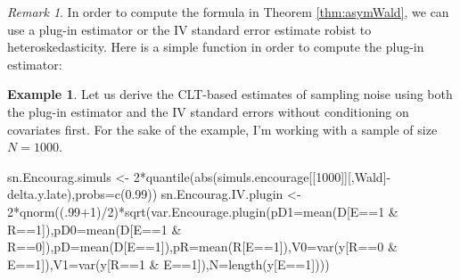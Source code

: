\documentclass[
]{book}
\newenvironment{Shaded}{\begin{snugshade}}{\end{snugshade}}
\newcommand{\AttributeTok}[1]{\textcolor[rgb]{0.77,0.63,0.00}{#1}}
\newcommand{\DecValTok}[1]{\textcolor[rgb]{0.00,0.00,0.81}{#1}}
\newcommand{\FloatTok}[1]{\textcolor[rgb]{0.00,0.00,0.81}{#1}}
\newcommand{\FunctionTok}[1]{\textcolor[rgb]{0.00,0.00,0.00}{#1}}
\newcommand{\NormalTok}[1]{#1}
\newcommand{\OtherTok}[1]{\textcolor[rgb]{0.56,0.35,0.01}{#1}}
\newcommand{\SpecialCharTok}[1]{\textcolor[rgb]{0.00,0.00,0.00}{#1}}
\newcommand{\StringTok}[1]{\textcolor[rgb]{0.31,0.60,0.02}{#1}}
\theoremstyle{definition}
\theoremstyle{definition}
\newtheorem{example}{Example}[chapter]
\theoremstyle{definition}
\theoremstyle{definition}
\theoremstyle{remark}
\newtheorem*{remark}{Remark}
\begin{document}
\begin{remark}
\iffalse{} {Remark. } \fi{}In order to compute the formula in Theorem \ref{thm:asymWald}, we can use a plug-in estimator or the IV standard error estimate robist to heteroskedasticity.
Here is a simple function in order to compute the plug-in estimator:
\end{remark}

\begin{example}
\protect\hypertarget{exm:unnamed-chunk-134}{}{\label{exm:unnamed-chunk-134} }Let us derive the CLT-based estimates of sampling noise using both the plug-in estimator and the IV standard errors without conditioning on covariates first.
For the sake of the example, I'm working with a sample of size \(N=1000\).
\end{example}

\begin{Shaded}
\begin{Highlighting}[]
\NormalTok{sn.Encourag.simuls }\OtherTok{\textless{}{-}} \DecValTok{2}\SpecialCharTok{*}\FunctionTok{quantile}\NormalTok{(}\FunctionTok{abs}\NormalTok{(simuls.encourage[[}\StringTok{\textquotesingle{}1000\textquotesingle{}}\NormalTok{]][,}\StringTok{\textquotesingle{}Wald\textquotesingle{}}\NormalTok{]}\SpecialCharTok{{-}}\NormalTok{delta.y.late),}\AttributeTok{probs=}\FunctionTok{c}\NormalTok{(}\FloatTok{0.99}\NormalTok{))}
\NormalTok{sn.Encourag.IV.plugin }\OtherTok{\textless{}{-}} \DecValTok{2}\SpecialCharTok{*}\FunctionTok{qnorm}\NormalTok{((.}\DecValTok{99}\SpecialCharTok{+}\DecValTok{1}\NormalTok{)}\SpecialCharTok{/}\DecValTok{2}\NormalTok{)}\SpecialCharTok{*}\FunctionTok{sqrt}\NormalTok{(}\FunctionTok{var.Encourage.plugin}\NormalTok{(}\AttributeTok{pD1=}\FunctionTok{mean}\NormalTok{(D[E}\SpecialCharTok{==}\DecValTok{1} \SpecialCharTok{\&}\NormalTok{ R}\SpecialCharTok{==}\DecValTok{1}\NormalTok{]),}\AttributeTok{pD0=}\FunctionTok{mean}\NormalTok{(D[E}\SpecialCharTok{==}\DecValTok{1} \SpecialCharTok{\&}\NormalTok{ R}\SpecialCharTok{==}\DecValTok{0}\NormalTok{]),}\AttributeTok{pD=}\FunctionTok{mean}\NormalTok{(D[E}\SpecialCharTok{==}\DecValTok{1}\NormalTok{]),}\AttributeTok{pR=}\FunctionTok{mean}\NormalTok{(R[E}\SpecialCharTok{==}\DecValTok{1}\NormalTok{]),}\AttributeTok{V0=}\FunctionTok{var}\NormalTok{(y[R}\SpecialCharTok{==}\DecValTok{0} \SpecialCharTok{\&}\NormalTok{ E}\SpecialCharTok{==}\DecValTok{1}\NormalTok{]),}\AttributeTok{V1=}\FunctionTok{var}\NormalTok{(y[R}\SpecialCharTok{==}\DecValTok{1} \SpecialCharTok{\&}\NormalTok{ E}\SpecialCharTok{==}\DecValTok{1}\NormalTok{]),}\AttributeTok{N=}\FunctionTok{length}\NormalTok{(y[E}\SpecialCharTok{==}\DecValTok{1}\NormalTok{])))}

\end{Highlighting}
\end{Shaded}
\end{document}
